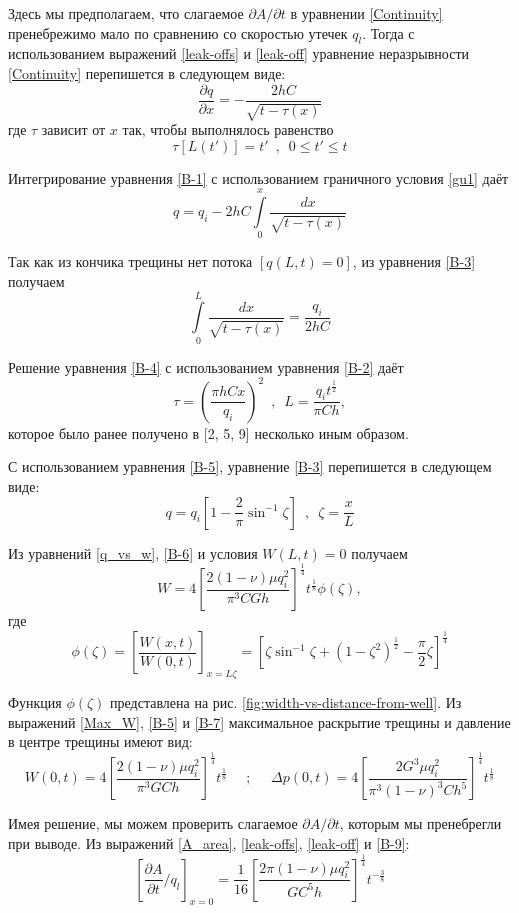 \documentclass[a4paper, 11pt]{article}
\newcommand{\beq}{\begin{equation}}
\newcommand{\eeq}{\end{equation}}
\begin{document}
Здесь мы предполагаем, что слагаемое $\partial A/\partial t$ в уравнении \eqref{Continuity} пренебрежимо мало по сравнению со скоростью утечек $q_l$.
Тогда с использованием выражений \eqref{leak-offs} и \eqref{leak-off} уравнение неразрывности \eqref{Continuity} перепишется в следующем виде:
\beq\label{B-1}
\frac{\partial q}{\partial x}=-\frac{2hC}{\sqrt{t-\tau(x)}}
\tag{B-1}
\eeq
где $\tau$ зависит от $x$ так, чтобы выполнялось равенство
\beq\label{B-2}
\tau\left[L(t')\right]=t'\,\,\,,\,\,\,0\leqslant t'\leqslant t
\tag{B-2}
\eeq

Интегрирование уравнения \eqref{B-1} с использованием граничного условия \eqref{gu1} даёт
\beq\label{B-3}
q=q_i-2hC\int\limits_{0}^{x}{\frac{dx}{\sqrt{t-\tau(x)}}}
\tag{B-3}
\eeq

Так как из кончика трещины нет потока $\left[q(L,t)=0\right]$, из уравнения \eqref{B-3} получаем
\beq\label{B-4}
\int\limits_{0}^{L}{\frac{dx}{\sqrt{t-\tau(x)}}}=\frac{q_i}{2hC}
\tag{B-4}
\eeq

Решение уравнения \eqref{B-4} с использованием уравнения \eqref{B-2} даёт
\beq\label{B-5}
\tau=\left(\frac{\pi hCx}{q_i}\right)^2\,\,\,,\,\,\,L=\frac{q_it^{\frac{1}{2}}}{\pi Ch},
\tag{B-5}
\eeq
которое было ранее получено в [2, 5, 9] несколько иным образом.

С использованием уравнения \eqref{B-5}, уравнение \eqref{B-3} перепишется в следующем виде:
\beq\label{B-6}
q=q_i\left[1-\frac{2}{\pi}\sin^{-1}{\zeta}\right]\,\,\,,\,\,\,\zeta=\frac{x}{L}
\tag{B-6}
\eeq

Из уравнений \eqref{q_vs_w}, \eqref{B-6} и условия $W(L,t)=0$ получаем
\beq\label{B-7}
W=4\left[\frac{2(1-\nu)\mu q_i^2}{\pi^3 CGh}\right]^{\frac{1}{4}}t^{\frac{1}{8}}\phi(\zeta),
\tag{B-7}
\eeq
где
\beq\label{B-8}
\phi(\zeta)=\left[\frac{W(x,t)}{W(0,t)}\right]_{x=L\zeta}=\left[\zeta\sin^{-1}{\zeta}+(1-\zeta^2)^{\frac{1}{2}}-\frac{\pi}{2}\zeta\right]^{\frac{1}{4}}
\tag{B-8}
\eeq

Функция $\phi(\zeta)$ представлена на рис. \ref{fig:width-vs-distance-from-well}.
Из выражений \eqref{Max_W}, \eqref{B-5} и \eqref{B-7} максимальное раскрытие трещины и давление в центре трещины имеют вид:
\beq\label{B-9}
W(0,t)=4\left[\frac{2(1-\nu)\mu q_i^2}{\pi^3 GCh}\right]^{\frac{1}{4}}t^{\frac{1}{8}}\,\,\,\,\,\,\,\,;\,\,\,\,\,\,\,\,\Delta p(0,t)=4\left[\frac{2G^3\mu q_i^2}{\pi^3(1-\nu)^3 Ch^5}\right]^{\frac{1}{4}}t^{\frac{1}{8}}
\tag{B-9}
\eeq

Имея решение, мы можем проверить слагаемое $\partial A/\partial t$, которым мы пренебрегли при выводе.
Из выражений \eqref{A_area}, \eqref{leak-offs}, \eqref{leak-off} и \eqref{B-9}:
\beq\label{B-10}
\left[\frac{\partial A}{\partial t}/q_l\right]_{x=0}=\frac{1}{16}\left[\frac{2\pi(1-\nu)\mu q_i^2}{GC^5h}\right]^{\frac{1}{4}}t^{-\frac{3}{8}}
\tag{B-10}
\eeq
\end{document}
